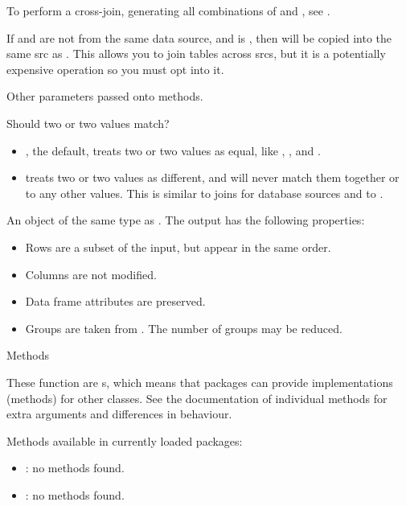 \documentclass[a4paper]{book}
\begin{document}
\begin{Arguments}
\begin{ldescription}
To perform a cross-join, generating all combinations of  and , see
.

\item[\code{copy}] If  and  are not from the same data source,
and  is , then  will be copied into the
same src as .  This allows you to join tables across srcs, but
it is a potentially expensive operation so you must opt into it.

\item[\code{...}] Other parameters passed onto methods.

\item[\code{na\_matches}] Should two  or two  values match?
\begin{itemize}

\item{} , the default, treats two  or two  values as equal, like
, , and .
\item{}  treats two  or two  values as different, and will
never match them together or to any other values. This is similar to joins
for database sources and to .

\end{itemize}

\end{ldescription}
\end{Arguments}
%
\begin{Value}
An object of the same type as . The output has the following properties:
\begin{itemize}

\item{} Rows are a subset of the input, but appear in the same order.
\item{} Columns are not modified.
\item{} Data frame attributes are preserved.
\item{} Groups are taken from . The number of groups may be reduced.

\end{itemize}

\end{Value}
%
\begin{Section}{Methods}

These function are s, which means that packages can provide
implementations (methods) for other classes. See the documentation of
individual methods for extra arguments and differences in behaviour.

Methods available in currently loaded packages:
\begin{itemize}

\item{} : no methods found.
\item{} : no methods found.

\end{itemize}

\end{Section}
\end{document}
